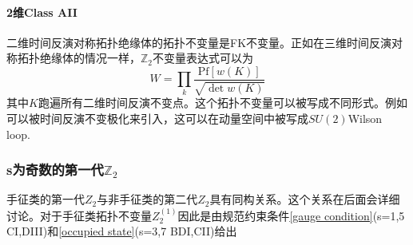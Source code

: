 \documentclass{article}
\numberwithin{equation}{subsection}
\begin{document}
\paragraph{2维Class AII}
二维时间反演对称拓扑绝缘体的拓扑不变量是FK不变量。正如在三维时间反演对称拓扑绝缘体的情况一样，$\mathbb{Z}_2$不变量表达式可以为
\begin{equation}
    W=\prod_{k}\frac{\mathrm{Pf}[w(K)]}{\sqrt{\det w(K)}}
\end{equation}
其中$K$跑遍所有二维时间反演不变点。这个拓扑不变量可以被写成不同形式。例如可以被时间反演不变极化来引入，这可以在动量空间中被写成$SU(2)$Wilson loop.
\subsubsection{s为奇数的第一代$\mathbb{Z}_2$}
手征类的第一代$Z_2$与非手征类的第二代$Z_2$具有同构关系。这个关系在后面会详细讨论。对于手征类拓扑不变量$Z_2^{(1)}$因此是由规范约束条件\eqref{gauge condition}(s=1,5 CI,DIII)和\eqref{occupied state}(s=3,7 BDI,CII)给出
\end{document}

